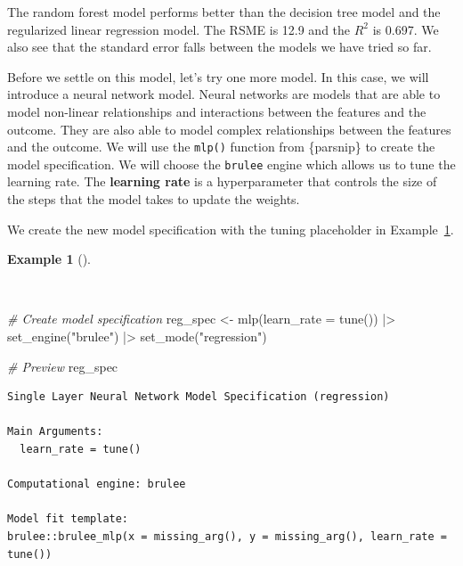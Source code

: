 \documentclass[
  letterpaper,
  krantz1]{latex/krantz-mod}
\newenvironment{Shaded}{\begin{snugshade}}{\end{snugshade}}
\newcommand{\AttributeTok}[1]{\textcolor[rgb]{0.00,0.00,0.00}{#1}}
\newcommand{\CommentTok}[1]{\textcolor[rgb]{0.00,0.00,0.00}{\textit{#1}}}
\newcommand{\FunctionTok}[1]{\textcolor[rgb]{0.00,0.00,0.00}{#1}}
\newcommand{\NormalTok}[1]{\textcolor[rgb]{0.00,0.00,0.00}{#1}}
\newcommand{\OtherTok}[1]{\textcolor[rgb]{0.00,0.00,0.00}{#1}}
\newcommand{\SpecialCharTok}[1]{\textcolor[rgb]{0.00,0.00,0.00}{#1}}
\newcommand{\StringTok}[1]{\textcolor[rgb]{0.00,0.00,0.00}{#1}}
\theoremstyle{definition}
\newtheorem{example}{Example}[chapter]
\theoremstyle{definition}
\theoremstyle{remark}
\begin{document}
The random forest model performs better than the decision tree model and
the regularized linear regression model. The RSME is 12.9 and the
\(R^2\) is 0.697. We also see that the standard error falls between the
models we have tried so far.

Before we settle on this model, let's try one more model. In this case,
we will introduce a neural network model. Neural networks are models
that are able to model non-linear relationships and interactions between
the features and the outcome. They are also able to model complex
relationships between the features and the outcome. We will use the
\texttt{mlp()} function from \{parsnip\} to create the model
specification. We will choose the \texttt{brulee} engine which allows us
to tune the learning rate. The \textbf{learning rate} is a
hyperparameter that controls the size of the steps that the model takes
to update the weights.

We create the new model specification with the tuning placeholder in
Example~\ref{exm-predict-reg-model-spec-mlp}.

\begin{example}[]\protect\hypertarget{exm-predict-reg-model-spec-mlp}{}\label{exm-predict-reg-model-spec-mlp}

~

\begin{Shaded}
\begin{Highlighting}[numbers=left,,]
\CommentTok{\# Create model specification}
\NormalTok{reg\_spec }\OtherTok{\textless{}{-}}
  \FunctionTok{mlp}\NormalTok{(}\AttributeTok{learn\_rate =} \FunctionTok{tune}\NormalTok{()) }\SpecialCharTok{|\textgreater{}}
  \FunctionTok{set\_engine}\NormalTok{(}\StringTok{"brulee"}\NormalTok{) }\SpecialCharTok{|\textgreater{}}
  \FunctionTok{set\_mode}\NormalTok{(}\StringTok{"regression"}\NormalTok{)}

\CommentTok{\# Preview}
\NormalTok{reg\_spec}
\end{Highlighting}
\end{Shaded}

\begin{verbatim}
Single Layer Neural Network Model Specification (regression)

Main Arguments:
  learn_rate = tune()

Computational engine: brulee

Model fit template:
brulee::brulee_mlp(x = missing_arg(), y = missing_arg(), learn_rate = tune())
\end{verbatim}

\end{example}
\end{document}
